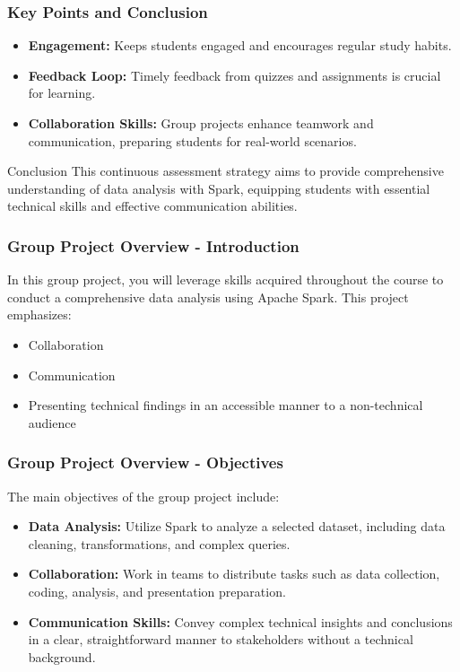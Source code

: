\documentclass[aspectratio=169]{beamer}
\begin{document}
\begin{frame}
    \frametitle{Key Points and Conclusion}
    \begin{itemize}
        \item \textbf{Engagement:} Keeps students engaged and encourages regular study habits.
        \item \textbf{Feedback Loop:} Timely feedback from quizzes and assignments is crucial for learning.
        \item \textbf{Collaboration Skills:} Group projects enhance teamwork and communication, preparing students for real-world scenarios.
    \end{itemize}
    
    \begin{block}{Conclusion}
        This continuous assessment strategy aims to provide comprehensive understanding of data analysis with Spark, equipping students with essential technical skills and effective communication abilities.
    \end{block}
\end{frame}

\begin{frame}[fragile]
  \frametitle{Group Project Overview - Introduction}
  In this group project, you will leverage skills acquired throughout the course to conduct a comprehensive data analysis using Apache Spark. This project emphasizes:
  \begin{itemize}
    \item Collaboration
    \item Communication
    \item Presenting technical findings in an accessible manner to a non-technical audience
  \end{itemize}
\end{frame}

\begin{frame}[fragile]
  \frametitle{Group Project Overview - Objectives}
  The main objectives of the group project include:
  \begin{itemize}
    \item \textbf{Data Analysis:} Utilize Spark to analyze a selected dataset, including data cleaning, transformations, and complex queries.
    \item \textbf{Collaboration:} Work in teams to distribute tasks such as data collection, coding, analysis, and presentation preparation.
    \item \textbf{Communication Skills:} Convey complex technical insights and conclusions in a clear, straightforward manner to stakeholders without a technical background.
  \end{itemize}
\end{frame}
\end{document}
